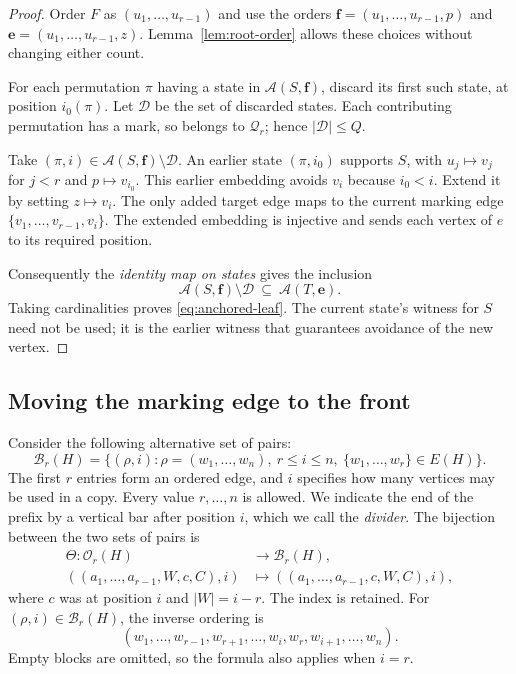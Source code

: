 \documentclass[11pt]{article}
\numberwithin{equation}{section}
\theoremstyle{definition}
\newcommand{\cA}{\mathcal A}
\newcommand{\cD}{\mathcal D}
\newcommand{\cO}{\mathcal O}
\newcommand{\cQ}{\mathcal Q}
\begin{document}
\begin{proof}
Order $F$ as $(u_1,\ldots,u_{r-1})$ and use the orders
$\mathbf f=(u_1,\ldots,u_{r-1},p)$ and
$\mathbf e=(u_1,\ldots,u_{r-1},z)$.  Lemma~\ref{lem:root-order}
allows these choices without changing either count.

For each permutation $\pi$ having a state in $\cA(S,\mathbf f)$,
discard its first such state, at position $i_0(\pi)$.  Let $\cD$ be
the set of discarded states.  Each contributing permutation has a mark,
so belongs to $\cQ_r$; hence $|\cD|\leq Q$.

Take $(\pi,i)\in\cA(S,\mathbf f)\setminus\cD$.  An earlier state
$(\pi,i_0)$ supports $S$, with $u_j\mapsto v_j$ for $j<r$ and
$p\mapsto v_{i_0}$.  This earlier embedding avoids $v_i$ because
$i_0<i$.  Extend it by setting $z\mapsto v_i$.  The only added target
edge maps to the current marking edge
$\{v_1,\ldots,v_{r-1},v_i\}$.  The extended embedding is injective
and sends each vertex of $e$ to its required position.

Consequently the \emph{identity map on states} gives the inclusion
\[
 \cA(S,\mathbf f)\setminus\cD\ \subseteq\ \cA(T,\mathbf e).
\]
Taking cardinalities proves \eqref{eq:anchored-leaf}.  The current
state's witness for $S$ need not be used; it is the earlier witness
that guarantees avoidance of the new vertex.
\end{proof}

\subsection{Moving the marking edge to the front}

Consider the following alternative set of pairs:
\[
 \mathcal B_r(H)=\{(\rho,i):\rho=(w_1,\ldots,w_n),\ r\leq i\leq n,
                         \ \{w_1,\ldots,w_r\}\in E(H)\}.
\]
The first $r$ entries form an ordered edge, and $i$ specifies how many
vertices may be used in a copy.  Every value $r,\ldots,n$ is allowed.
We indicate the end of the prefix by a vertical bar after position $i$,
which we call the \emph{divider}.  The bijection between the two
sets of pairs is
\begin{equation}
 \begin{split}
 \Theta:\cO_r(H)&\longrightarrow\mathcal B_r(H),\\
 ((a_1,\ldots,a_{r-1},W,c,C),i)
   &\longmapsto ((a_1,\ldots,a_{r-1},c,W,C),i),
 \end{split}
 \label{eq:edge-front}
\end{equation}
where $c$ was at position $i$ and $|W|=i-r$.  The index is retained.
For $(\rho,i)\in\mathcal B_r(H)$, the inverse ordering is
\begin{equation}
 (w_1,\ldots,w_{r-1},w_{r+1},\ldots,w_i,w_r,
                                      w_{i+1},\ldots,w_n).
 \label{eq:edge-front-inverse}
\end{equation}
Empty blocks are omitted, so the formula also applies when $i=r$.
\end{document}
